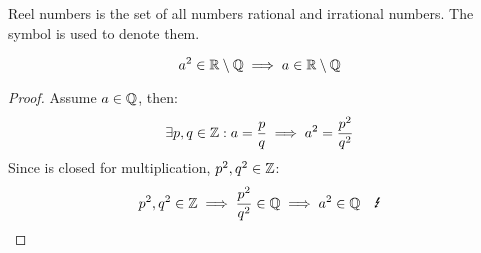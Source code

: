 \begin{definition}
    Reel numbers is the set of all numbers rational and irrational numbers.
    The symbol \R{} is used to denote them.
\end{definition}

\begin{lemma}
    \begin{equation}
        a^2 \in \mathbb{R} \setminus \mathbb{Q} \implies a \in \mathbb{R} \setminus \mathbb{Q}
    \end{equation}
\end{lemma}
\begin{proof}
    Assume $a \in \mathbb{Q}$, then:
    \begin{equation}
        \exists p,q \in \mathbb{Z}: a = \frac{p}{q} \implies a^2 = \frac{p^2}{q^2}
    \end{equation}
    Since \Z{} is closed for multiplication, $p^2,q^2 \in \mathbb{Z}$:
    \begin{equation}
        p^2,q^2 \in \Z \implies \frac{p^2}{q^2} \in \Q \implies a^2 \in \Q \quad \blitz 
    \end{equation}
\end{proof}